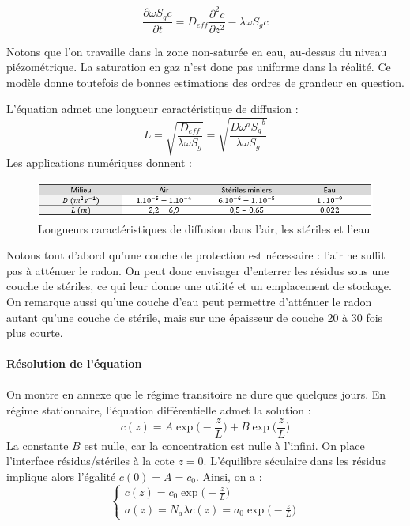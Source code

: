 \documentclass{article}
\begin{document}
$$
\frac{\partial \omega S_g c}{\partial t} = D_{eff}  \frac{\partial^2 c}{\partial z^2}-\lambda \omega S_g c
$$

Notons que l’on travaille dans la zone non-saturée en eau, au-dessus du niveau piézométrique. La saturation en gaz n’est donc pas uniforme dans la réalité. Ce modèle donne toutefois de bonnes estimations des ordres de grandeur en question. 

L’équation admet une longueur caractéristique de diffusion :
$$
L=\sqrt{\frac{D_{eff}}{\lambda \omega S_g }}=\sqrt{\frac{D \omega^a {S_g}^b}{\lambda \omega S_g }}
$$
Les applications numériques donnent :

\begin{figure}[H]
    \centering
    \includegraphics[width = \linewidth]{III_C_2.png}
    \caption{Longueurs caractéristiques de diffusion dans l'air, les stériles et l'eau}
    \label{fig:longueur_diffusion}
\end{figure}

Notons tout d’abord qu’une couche de protection est nécessaire : l’air ne suffit pas à atténuer le radon. On peut donc envisager d’enterrer les résidus sous une couche de stériles, ce qui leur donne une utilité et un emplacement de stockage. On remarque aussi qu’une couche d’eau peut permettre d’atténuer le radon autant qu’une couche de stérile, mais sur une épaisseur de couche 20 à 30 fois plus courte.

\newpage
\paragraph{Résolution de l'équation}

\paragraph{} On montre en annexe que le régime transitoire ne dure que quelques jours. En régime stationnaire, l’équation différentielle admet la solution :
$$
c(z)=A \exp \Big(-\frac{z}{L} \Big)+B \exp \Big( \frac{z}{L} \Big)
$$
La constante $B$ est nulle, car la concentration est nulle à l’infini. On place l’interface résidus/stériles à la cote $z=0$. L’équilibre séculaire dans les résidus implique alors l’égalité $c(0)=A=c_0$. Ainsi, on a :
$$
\left\{ \begin{array}{cl}
c(z)=c_0 \exp\Big(-\frac{z}{L}\Big) \\
a(z)=N_a \lambda c(z) =a_0 \exp\Big(-\frac{z}{L}\Big)
\end{array} \right.
$$
\end{document}
